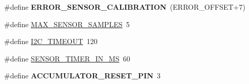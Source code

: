 \begin{DoxyCompactItemize}
\item 
\mbox{\label{group___base_sensors_module_gab8b74c7fa45cf689a9ab880e550e33d8}} 
\#define {\bfseries E\+R\+R\+O\+R\+\_\+\+S\+E\+N\+S\+O\+R\+\_\+\+C\+A\+L\+I\+B\+R\+A\+T\+I\+ON}~(E\+R\+R\+O\+R\+\_\+\+O\+F\+F\+S\+ET+7)
\item 
\#define \hyperlink{group___base_sensors_module_ga758742adca8f7b427482748255303be6}{M\+A\+X\+\_\+\+S\+E\+N\+S\+O\+R\+\_\+\+S\+A\+M\+P\+L\+ES}~5
\item 
\#define \hyperlink{group___base_sensors_module_gafa3215f0aa766367f5d34bee80929152}{I2\+C\+\_\+\+T\+I\+M\+E\+O\+UT}~120
\item 
\#define \hyperlink{group___base_sensors_module_ga611d7dd5e373a17db1c7ed6b2d4cea68}{S\+E\+N\+S\+O\+R\+\_\+\+T\+I\+M\+E\+R\+\_\+\+I\+N\+\_\+\+MS}~60
\item 
\mbox{\label{group___base_sensors_module_gaf6401ecaef3aa18d868431a6dd538bc0}} 
\#define {\bfseries A\+C\+C\+U\+M\+U\+L\+A\+T\+O\+R\+\_\+\+R\+E\+S\+E\+T\+\_\+\+P\+IN}~3
\end{DoxyCompactItemize}
